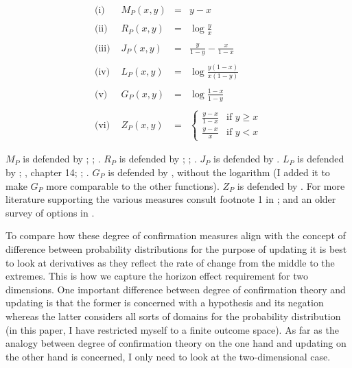 \documentclass[11pt]{article}
\begin{document}
\begin{equation}
  \label{eq:relevance}
  \begin{array}{lrcl}
    \mbox{(i) } & M_{P}(x,y)&=&y-x \\
                &&& \\
    \mbox{(ii) } & R_{P}(x,y)&=&\displaystyle\log\frac{y}{x} \\
                &&& \\
    \mbox{(iii) } & J_{P}(x,y)&=&\displaystyle\frac{y}{1-y}-\frac{x}{1-x} \\
                &&& \\
    \mbox{(iv) } & L_{P}(x,y)&=&\displaystyle\log\frac{y(1-x)}{x(1-y)} \\
                &&& \\
    \mbox{(v) } & G_{P}(x,y)&=&\displaystyle\log\frac{1-x}{1-y} \\
                &&& \\
    \mbox{(vi) } & Z_{P}(x,y)&=&\left\{
                                 \begin{array}{cl}
                                   \displaystyle\frac{y-x}{1-x}&\mbox{if }y\geq{}x \\
                                   \displaystyle\frac{y-x}{x}&\mbox{if }y<x
                                 \end{array}\right.
  \end{array}
\end{equation}

$M_{P}$ is defended by ; ;
. $R_{P}$ is defended by
; ; .
$J_{P}$ is defended by . $L_{P}$ is defended by
; , chapter 14;
; . $G_{P}$ is defended
by , without the logarithm (I added it to
make $G_{P}$ more comparable to the other functions). $Z_{P}$ is
defended by . For more literature supporting
the various measures consult footnote 1 in
; and an older survey of options in
.

To compare how these degree of confirmation measures align with the
concept of difference between probability distributions for the
purpose of updating it is best to look at derivatives as they reflect
the rate of change from the middle to the extremes. This is how we
capture the horizon effect requirement for two dimensions. One
important difference between degree of confirmation theory and
updating is that the former is concerned with a hypothesis and its
negation whereas the latter considers all sorts of domains for the
probability distribution (in this paper, I have restricted myself to a
finite outcome space). As far as the analogy between degree of
confirmation theory on the one hand and updating on the other hand is
concerned, I only need to look at the two-dimensional case.
\end{document}
